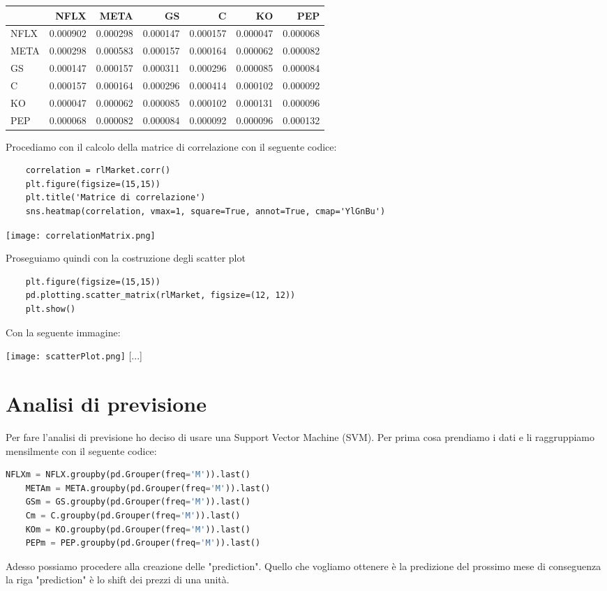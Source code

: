 \documentclass{report}
\begin{document}
\begin{tabular}{lrrrrrr}
\toprule
{} &      NFLX &      META &        GS &         C &        KO &       PEP \\
\midrule
NFLX &  0.000902 &  0.000298 &  0.000147 &  0.000157 &  0.000047 &  0.000068 \\
META &  0.000298 &  0.000583 &  0.000157 &  0.000164 &  0.000062 &  0.000082 \\
GS   &  0.000147 &  0.000157 &  0.000311 &  0.000296 &  0.000085 &  0.000084 \\
C    &  0.000157 &  0.000164 &  0.000296 &  0.000414 &  0.000102 &  0.000092 \\
KO   &  0.000047 &  0.000062 &  0.000085 &  0.000102 &  0.000131 &  0.000096 \\
PEP  &  0.000068 &  0.000082 &  0.000084 &  0.000092 &  0.000096 &  0.000132 \\
\bottomrule
\end{tabular}

Procediamo con il calcolo della matrice di correlazione con il seguente codice:
\begin{lstlisting}
    correlation = rlMarket.corr()
    plt.figure(figsize=(15,15))
    plt.title('Matrice di correlazione')
    sns.heatmap(correlation, vmax=1, square=True, annot=True, cmap='YlGnBu')
\end{lstlisting}

\texttt{[image: correlationMatrix.png]}

Proseguiamo quindi con la costruzione degli scatter plot
\begin{lstlisting}
    plt.figure(figsize=(15,15))
    pd.plotting.scatter_matrix(rlMarket, figsize=(12, 12))
    plt.show()
\end{lstlisting}
Con la seguente immagine:

\texttt{[image: scatterPlot.png]}
[...]
\chapter{Analisi di previsione}
Per fare l'analisi di previsione ho deciso di usare una Support Vector Machine (SVM). Per prima cosa prendiamo i dati e li raggruppiamo mensilmente con il seguente codice:
\begin{lstlisting}[language=python]
    NFLXm = NFLX.groupby(pd.Grouper(freq='M')).last()
    METAm = META.groupby(pd.Grouper(freq='M')).last()
    GSm = GS.groupby(pd.Grouper(freq='M')).last()
    Cm = C.groupby(pd.Grouper(freq='M')).last()
    KOm = KO.groupby(pd.Grouper(freq='M')).last()
    PEPm = PEP.groupby(pd.Grouper(freq='M')).last()
\end{lstlisting}
Adesso possiamo procedere alla creazione delle "prediction". Quello che vogliamo ottenere è la predizione del prossimo mese di conseguenza la riga "prediction" è lo shift dei prezzi di una unità.
\end{document}
